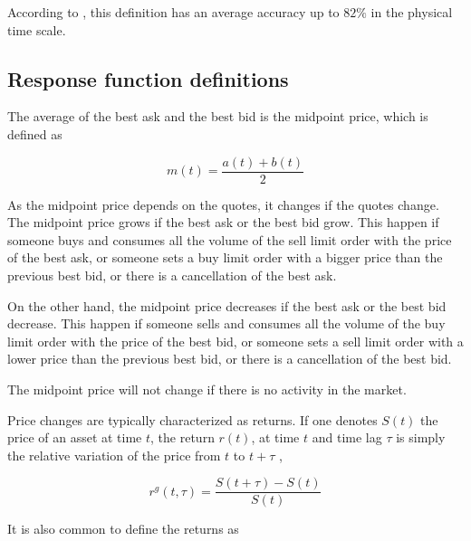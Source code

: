 According to \cite{Wang_2016_cross}, this definition has an average
accuracy up to $82\%$ in the physical time scale.


\subsection{Response function definitions}\label{subsec:response_def}
The average of the best ask and the best bid is the midpoint price, which is
defined as \cite{subtle_nature,Bouchaud_2004,large_prices_changes,prop_order_book,stat_theory}

\begin{equation}\label{eq:midpoint_price}
    m\left(t\right)=\frac{a\left(t\right)+b\left(t\right)}{2}
\end{equation}

As the midpoint price depends on the quotes, it changes if the quotes change.
The midpoint price grows if the best ask or the best bid grow. This happen if
someone buys and consumes all the volume of the sell limit order with the price
of the best ask, or someone sets a buy limit order with a bigger price than the
previous best bid, or there is a cancellation of the best ask.

On the other hand, the midpoint price decreases if the best ask or the best bid
decrease. This happen if someone sells and consumes all the volume of the buy
limit order with the price of the best bid, or someone sets a sell limit order
with a lower price than the previous best bid, or there is a cancellation of
the best bid.

The midpoint price will not change if there is no activity in the market.

Price changes are typically characterized as returns. If one denotes
$S\left( t\right)$ the price of an asset at time $t$, the return
$r\left(t\right)$, at time $t$ and time lag $\tau$ is simply the relative
variation of the price from $t$ to $t + \tau$
\cite{subtle_nature,empirical_facts,asynchrony_effects_corr,tick_size_impact,causes_epps_effect,non_stationarity},

\begin{equation}\label{eq:return_general}
    r^{g} \left(t, \tau \right) = \frac{S\left(t + \tau\right)
    - S\left(t\right)}{S\left(t\right)}
\end{equation}

It is also common to define the returns as
\cite{dissecting_cross,subtle_nature,empirical_facts,empirical_properties,large_prices_changes,theory_market_impact,spread_changes_affect,fluctions_market_friction,pow_law_dist,rand_mat}

